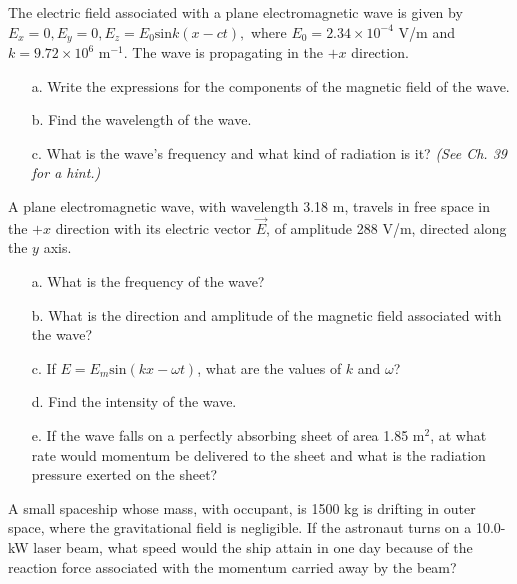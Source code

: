 \documentclass[11pt,letterpaper,boxed]{pset}
\begin{document}
    \begin{problem} [E38.16]
        The electric field associated with a plane electromagnetic wave is given by $E_x = 0, E_y = 0, E_z = E_0 \text{sin} k(x-ct),$ where $E_0 = 2.34 \times 10^{-4}$ V/m and $k = 9.72 \times 10^6$ m$^{-1}$. The wave is propagating in the $+x$ direction. 
        
        \begin{enumerate}
            \item [a.] Write the expressions for the components of the magnetic field of the wave.
            \item [b.] Find the wavelength of the wave.
            \item [c.] What is the wave’s frequency and what kind of radiation is it? \textit{(See Ch. 39 for a hint.)}
        \end{enumerate}
    \end{problem}
    \newpage
    
    \begin{problem} [P38.13]
        A plane electromagnetic wave, with wavelength 3.18 m, travels in free space in the $+x$ direction with its electric vector $\Vec{E}$, of amplitude 288 V/m, directed along the $y$ axis.
        
        \begin{enumerate}
            \item [a.] What is the frequency of the wave?
            \item [b.] What is the direction and amplitude of the magnetic field associated with the wave?
            \item [c.] If $E = E_m \text{sin} (kx - \omega t)$, what are the values of $k$ and $\omega$?
            \item [d.] Find the intensity of the wave.
            \item [e.] If the wave falls on a perfectly absorbing sheet of area 1.85 m$^2$, at what rate would momentum be delivered to the sheet and what is the radiation pressure exerted on the sheet?
        \end{enumerate}
    \end{problem}
    \newpage
    
    \begin{problem} [E38.42]
        A small spaceship whose mass, with occupant, is 1500 kg is drifting in outer space, where the gravitational field is negligible. If the astronaut turns on a 10.0-kW laser beam, what speed would the ship attain in one day because of the reaction force associated with the momentum carried away by the beam?
    \end{problem}
    \newpage
\end{document}
